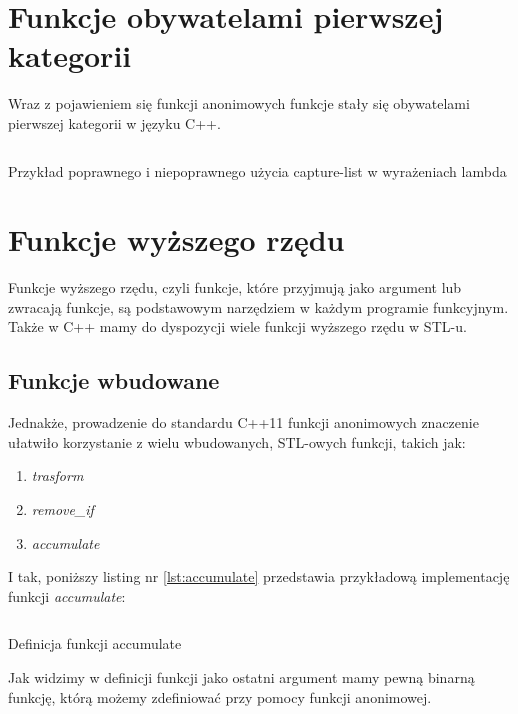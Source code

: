 \documentclass{pracamgr}
\begin{document}
\section{Funkcje obywatelami pierwszej kategorii}

Wraz z pojawieniem się funkcji anonimowych funkcje stały się obywatelami pierwszej kategorii w języku C++.

\begin{listing}[ht]
\inputminted[mathescape, linenos, numbersep=5pt, bgcolor=bg, rulecolor=\color{darkgray}, frame=lines, framesep=2mm]{cpp}{firstCategory.cpp}
\caption{Przykład poprawnego i niepoprawnego użycia capture-list w wyrażeniach lambda}
\label{listing:3}
\end{listing}






\section{Funkcje wyższego rzędu}


Funkcje wyższego rzędu, czyli funkcje, które przyjmują jako argument lub zwracają funkcje, są 
podstawowym narzędziem w każdym programie funkcyjnym. 
Także w C++ mamy do dyspozycji wiele funkcji wyższego rzędu w STL-u.


\subsection{Funkcje wbudowane}
Jednakże, prowadzenie do standardu C++11 funkcji anonimowych znaczenie ułatwiło korzystanie z wielu wbudowanych, STL-owych funkcji, 
takich jak:
\begin{enumerate}
\item \textit{trasform}
\item \textit{remove\_if}
\item \textit{accumulate}
\end{enumerate}

\noindent
I tak, poniższy listing nr \ref{lst:accumulate} przedstawia przykładową implementację funkcji \textit{accumulate}:

\begin{listing}[H]
\inputminted[mathescape, linenos, numbersep=5pt, bgcolor=bg, rulecolor=\color{darkgray}, frame=lines, framesep=2mm]{cpp}{accumulate.cpp}
\caption{Definicja funkcji accumulate}
\label{lst:accumulate}
\end{listing}


Jak widzimy w definicji funkcji jako ostatni argument mamy pewną binarną funkcję, którą możemy
zdefiniować przy pomocy funkcji anonimowej.
\end{document}

